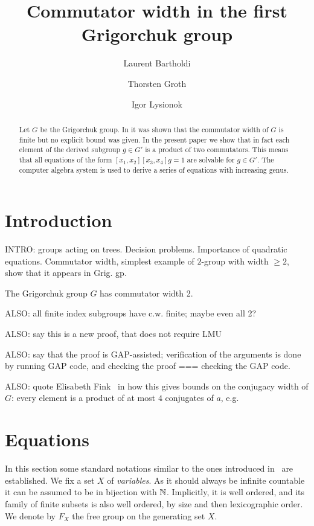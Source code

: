 \documentclass[a4paper,11pt]{amsart}
\begin{document}
\title{Commutator width in the first Grigorchuk group}
\author{Laurent Bartholdi}
\author{Thorsten Groth}
\author{Igor Lysionok}
\begin{abstract}
Let $G$ be the Grigorchuk group. In \cite{Lysenok:QudraticEquationsInGrig} it was shown that the commutator width of $G$ is finite but no explicit bound was given.
In the present paper we show that in fact each element of the derived subgroup $g\in G'$ is a product of two commutators. This means that all equations
of the form $[x_1,x_2][x_3,x_4]g=1$ are solvable for $g\in G'$. The computer algebra system \cite{GAP4} is used to derive a series of equations with increasing 
genus. 
\end{abstract}
\maketitle
\tableofcontents

\section{Introduction}
INTRO: groups acting on trees. Decision problems. Importance of
quadratic equations. Commutator width, simplest example of $2$-group
with width $\ge2$, show that it appears in Grig. gp.

\begin{thm}
 The Grigorchuk group $G$ has commutator width 2.
\end{thm}
ALSO: all finite index subgroups have c.w. finite; maybe even all 2?

ALSO: say this is a new proof, that does not require LMU

ALSO: say that the proof is GAP-assisted; verification of the arguments is done by running GAP code, and checking the proof === checking the GAP code.

ALSO: quote Elisabeth Fink~\cite[Question 3]{Fink:Conjugacy_growth} in how this gives bounds on the conjugacy width of $G$: every element is a product of at most $4$ conjugates of $a$, e.g.

\section{Equations}
In this section some standard notations similar to the ones introduced
in~\cite{ComerfordEquationsFreeGroups} are established. We fix a set
$X$ of \emph{variables}. As it should always be infinite countable it
can be assumed to be in bijection with $\mathbb{N}$. Implicitly, it is well
ordered, and its family of finite subsets is also well ordered, by
size and then lexicographic order. We denote by $F_X$ the free group
on the generating set $X$.
\end{document}
